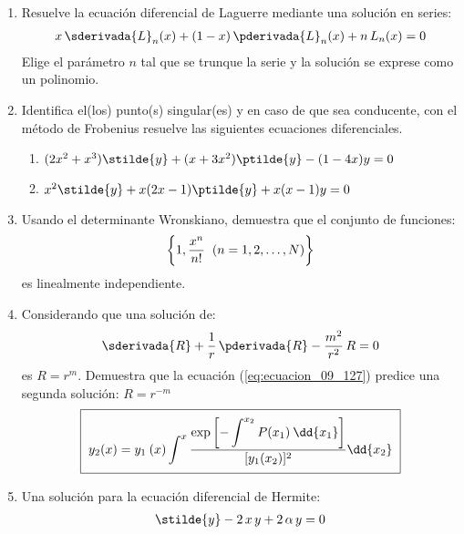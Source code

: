 \begin{enumerate}
\item Resuelve la ecuación diferencial de Laguerre mediante una solución en series:
\begin{align*}
x \, \sderivada{L}_{n} (x) + (1 - x) \, \pderivada{L}_{n} (x) + n \, L_{n} (x) = 0
\end{align*}
Elige el parámetro $n$ tal que se trunque la serie y la solución se exprese como un polinomio.
\item Identifica el(los) punto(s) singular(es) y en caso de que sea conducente, con el método de Frobenius resuelve las siguientes ecuaciones diferenciales.
\begin{enumerate}[label=\alph*)]
\item $(2 x^{2} + x^{3}) \stilde{y} + (x + 3 x^{2}) \ptilde{y} - (1 - 4 x) y = 0$
\item $x^{2} \stilde{y} + x (2 x - 1) \ptilde{y} + x(x - 1) y = 0$
\end{enumerate}
\item Usando el determinante Wronskiano, demuestra que el conjunto de funciones:
\begin{align*}
\left\{ 1, \dfrac{x^{n}}{n!} \hspace{0.2cm} (n = 1, 2, \ldots, N) \right\}
\end{align*}
es linealmente independiente.
\item Considerando que una solución de:
\begin{align*}
\sderivada{R} + \dfrac{1}{r} \, \pderivada{R} - \dfrac{m^{2}}{r^{2}} \, R = 0
\end{align*}
es $R = r^{m}$. Demuestra que la ecuación (\ref{eq:ecuacion_09_127}) predice una segunda solución: $R = r^{-m}$
\begin{align}
\setlength{\fboxsep}{2\fboxsep}\boxed{y_{2}(x) =  y_{1} \: (x) \int^{x} \dfrac{\exp \left[ \displaystyle - \int^{x_{2}} P(x_{1}) \: \dd{x_{1}} \right]}{[y_{1}(x_{2})]^{2}} \dd{x_{2}}}
\label{eq:ecuacion_09_127}
\end{align}
\item Una solución para la ecuación diferencial de Hermite:
\begin{align*}
\stilde{y} - 2 \, x \, y + 2 \, \alpha \, y = 0

\end{align*}
\end{enumerate}
